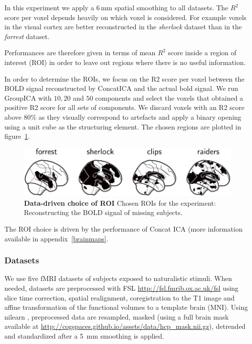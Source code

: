 In this experiment we apply a 6\,mm spatial smoothing to all datasets. The $R^2$ score per
voxel depends heavily on which voxel is considered. For example voxels in the
visual cortex are better reconstructed in the \emph{sherlock} dataset than in
the \emph{forrest} dataset.

Performances are therefore given in terms of mean $R^2$ score inside a region of interest (ROI)
in order to leave out regions where there is no useful information.

In order to determine the ROIs, we focus on the R2 score per voxel between the BOLD signal reconstructed by ConcatICA and the actual bold signal. We run GroupICA with $10, 20$ and $50$ components and select the voxels that obtained a positive R2 score for all sets of components.
% 
We discard voxels with an R2 score above 80\% as they visually correspond to artefacts and apply a binary opening using a unit cube as the structuring element. The chosen regions are plotted in figure~\ref{fig:roi}.

\begin{figure}
  \centering
  \includegraphics[width=\textwidth]{figures/mvica/reconstruction_score_roi.pdf}
  \caption{\textbf{Data-driven choice of ROI} Chosen ROIs for the experiment: Reconstructing the BOLD signal of missing subjects.}
  \label{fig:roi}
\end{figure}

The ROI choice is driven by the performance of Concat ICA (more information
available in appendix~\ref{brainmaps}.
\subsubsection{Datasets}

We use five fMRI datasets of subjects exposed to naturalistic stimuli. When needed, datasets are preprocessed with FSL \url{http://fsl.fmrib.ox.ac.uk/fsl} using slice time correction, spatial realignment, coregistration to the T1 image and affine transformation of the functional volumes to a template brain (MNI). Using nilearn \cite{abraham2014machine}, preprocessed data are resampled, masked (using a full brain mask available at \url{http://cogspaces.github.io/assets/data/hcp_mask.nii.gz}), detrended and standardized after a 5 mm smoothing is applied.  
%
